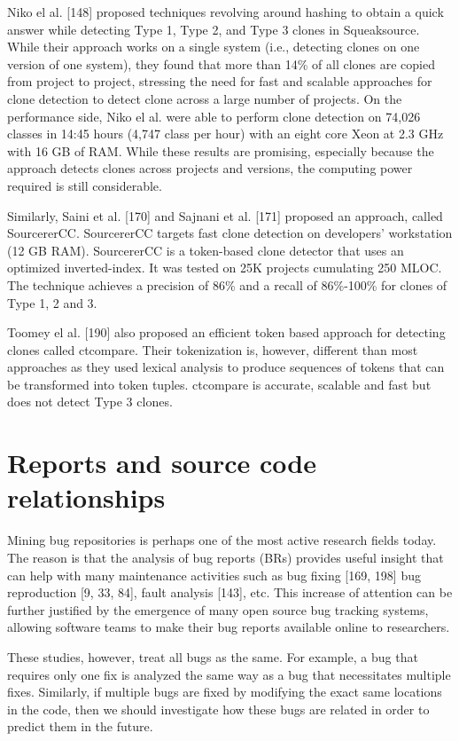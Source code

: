 \documentclass[12pt]{report}
\begin{document}
Niko el al. {[}148{]} proposed techniques revolving around hashing to
obtain a quick answer while detecting Type 1, Type 2, and Type 3 clones
in Squeaksource. While their approach works on a single system (i.e.,
detecting clones on one version of one system), they found that more
than 14\% of all clones are copied from project to project, stressing
the need for fast and scalable approaches for clone detection to detect
clone across a large number of projects. On the performance side, Niko
el al. were able to perform clone detection on 74,026 classes in 14:45
hours (4,747 class per hour) with an eight core Xeon at 2.3 GHz with 16
GB of RAM. While these results are promising, especially because the
approach detects clones across projects and versions, the computing
power required is still considerable.

Similarly, Saini et al. {[}170{]} and Sajnani et al. {[}171{]} proposed
an approach, called SourcererCC. SourcererCC targets fast clone
detection on developers' workstation (12 GB RAM). SourcererCC is a
token-based clone detector that uses an optimized inverted-index. It was
tested on 25K projects cumulating 250 MLOC. The technique achieves a
precision of 86\% and a recall of 86\%-100\% for clones of Type 1, 2 and
3.

Toomey el al. {[}190{]} also proposed an efficient token based approach
for detecting clones called ctcompare. Their tokenization is, however,
different than most approaches as they used lexical analysis to produce
sequences of tokens that can be transformed into token tuples. ctcompare
is accurate, scalable and fast but does not detect Type 3 clones.

\section{Reports and source code
relationships}\label{reports-and-source-code-relationships}

Mining bug repositories is perhaps one of the most active research
fields today. The reason is that the analysis of bug reports (BRs)
provides useful insight that can help with many maintenance activities
such as bug fixing {[}169, 198{]} bug reproduction {[}9, 33, 84{]},
fault analysis {[}143{]}, etc. This increase of attention can be further
justified by the emergence of many open source bug tracking systems,
allowing software teams to make their bug reports available online to
researchers.

These studies, however, treat all bugs as the same. For example, a bug
that requires only one fix is analyzed the same way as a bug that
necessitates multiple fixes. Similarly, if multiple bugs are fixed by
modifying the exact same locations in the code, then we should
investigate how these bugs are related in order to predict them in the
future.
\end{document}

